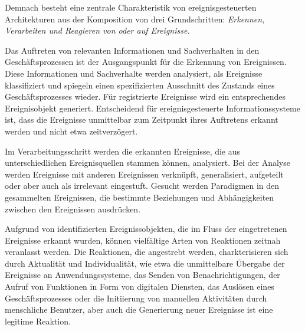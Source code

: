 Demnach besteht eine zentrale Charakteristik von ereignisgesteuerten Architekturen aus der Komposition von drei Grundschritten: \textit{Erkennen, Verarbeiten und Reagieren von oder auf Ereignisse.}

Das Auftreten von relevanten Informationen und Sachverhalten in  den Geschäftsprozessen ist der Ausgangspunkt für die Erkennung von Ereignissen.
Diese Informationen und Sachverhalte werden analysiert, als Ereignisse klassifiziert und spiegeln einen spezifizierten Ausschnitt des Zustands eines Geschäftsprozesses wieder. 
Für registrierte Ereignisse wird ein entsprechendes Ereignisobjekt generiert.
Entscheidend für ereignisgesteuerte Informationssysteme ist, dass die Ereignisse unmittelbar zum Zeitpunkt ihres Auftretens erkannt werden und nicht etwa zeitverzögert.
\cite{Bruns.2010}

Im Verarbeitungsschritt werden die erkannten Ereignisse, die aus unterschiedlichen Ereignisquellen stammen können, analysiert. Bei der Analyse werden Ereignisse mit anderen Ereignissen verknüpft, generalisiert, aufgeteilt oder aber auch als irrelevant eingestuft. 
Gesucht werden Paradigmen in den gesammelten Ereignissen, die bestimmte Beziehungen und Abhängigkeiten zwischen den Ereignissen ausdrücken.
\cite{Hedtstuck.2017}

Aufgrund von identifizierten Ereignissobjekten, die im Fluss der eingetretenen Ereignisse erkannt wurden, können vielfältige Arten von Reaktionen zeitnah veranlasst werden.
Die Reaktionen, die angestrebt werden, charkterisieren sich durch Aktualität und Individualität, wie etwa die unmittelbare Übergabe der Ereignisse an Anwendungssysteme, das Senden von Benachrichtigungen, der Aufruf von Funktionen in Form von digitalen Diensten, das Auslösen eines Geschäftsprozesses oder die Initiierung von manuellen Aktivitäten durch menschliche Benutzer, aber auch die Generierung neuer Ereignisse ist eine legitime Reaktion.
\cite{Bruns.2010}

